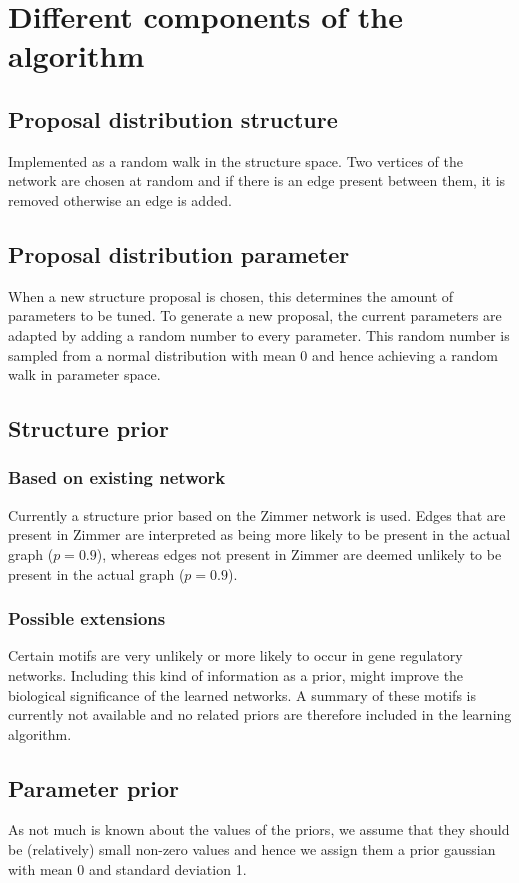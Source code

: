 \section{Different components of the algorithm}
\subsection{Proposal distribution structure}
Implemented as a random walk in the structure space. Two vertices of the network are chosen at random and if there is an edge present between them, it is removed otherwise an edge is added.
\subsection{Proposal distribution parameter}
When a new structure proposal is chosen, this determines the amount of parameters to be tuned. To generate a new proposal, the current parameters are adapted by adding a random number to every parameter. 
This random number is sampled from a normal distribution with mean 0 and hence achieving a random walk in parameter space.
\subsection{Structure prior}
\subsubsection{Based on existing network}
Currently a structure prior based on the Zimmer network is used. Edges that are present in Zimmer 
are interpreted as being more likely to be present in the actual graph ($p = 0.9$), whereas edges
not present in Zimmer are deemed unlikely to be present in the actual graph ($p = 0.9$).

\subsubsection{Possible extensions}
Certain motifs are very unlikely or more likely to occur in gene regulatory networks. Including this kind
of information as a prior, might improve the biological significance of the learned networks. A summary of these motifs 
is currently not available and no related priors are therefore included in the learning algorithm.

\subsection{Parameter prior}
As not much is known about the values of the priors, we assume that they should be (relatively) small non-zero values 
and hence we assign them a prior gaussian with mean 0 and standard deviation 1. 

